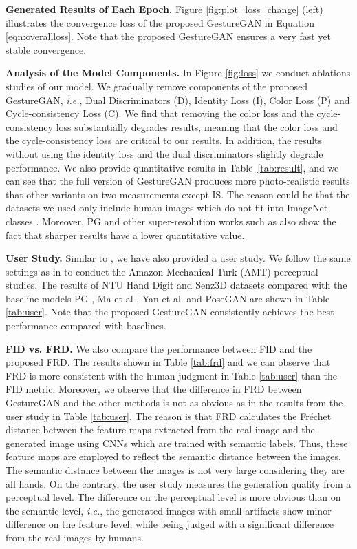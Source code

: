 \documentclass[sigconf]{acmart}
\begin{document}
\noindent \textbf{Generated Results of Each Epoch.}
Figure \ref{fig:plot_loss_change} (left) illustrates the convergence loss  of the proposed GestureGAN in Equation \ref{eqn:overallloss}. 
Note that the proposed GestureGAN ensures a very fast yet stable convergence.

\noindent \textbf{Analysis of the Model Components.}
In Figure \ref{fig:loss} we conduct ablations studies of our model.
We gradually remove components of the proposed GestureGAN, \textit{i.e.}, Dual Discriminators (D), Identity Loss (I), Color Loss (P) and Cycle-consistency Loss (C).
We find that removing the color loss and the cycle-consistency loss substantially degrades results, meaning that the color loss and the cycle-consistency loss are critical to our results.
In addition, the results without using the identity loss and the dual discriminators slightly degrade performance.
We also provide quantitative results in Table~\ref{tab:result}, and we can see that the full version of GestureGAN  produces more photo-realistic results that other variants on two measurements except IS.
The reason could be that the datasets we used only include human images which do not fit into ImageNet classes \cite{deng2009imagenet}. 
Moreover, PG \cite{ma2017pose} and other super-resolution works such as \cite{johnson2016perceptual}  also show the fact that sharper results have a lower quantitative value.

\noindent \textbf{User Study.}
Similar to \cite{ma2017pose,zhu2017unpaired,siarohin2017deformable}, we have also provided a user study. 
We follow the same settings as in \cite{isola2017image} to conduct the Amazon Mechanical Turk (AMT) perceptual studies.
The results of  NTU Hand Digit \cite{liu2016deepfashion} and Senz3D \cite{memo2016head} datasets compared with the baseline models PG \protect\cite{ma2017pose}, Ma et al \cite{ma2017disentangled}, Yan et al. \cite{yan2017skeleton} and PoseGAN \cite{siarohin2017deformable} are shown in Table \ref{tab:user}.
Note that the proposed GestureGAN consistently achieves the best performance compared with baselines.  

\noindent \textbf{FID vs. FRD.}
We also compare the performance between FID and the proposed FRD.
The results shown in Table \ref{tab:frd} and we can observe that FRD is more consistent with the human judgment in Table \ref{tab:user} than the FID metric.
Moreover, we observe that the difference in FRD between GestureGAN and the other methods is not as obvious as in the results from the user study in Table \ref{tab:user}.
The reason is that FRD calculates the Fr\'echet distance between the feature maps extracted from the real image and the generated image using CNNs which are trained with semantic labels. Thus, these feature maps are employed to reflect the semantic distance between the images. The semantic distance between the images is not very large considering they are all hands. On the contrary, the user study measures the generation quality from a perceptual level. The difference on the perceptual level is more obvious than on the semantic level, \emph{i.e.}, the generated images with small artifacts show minor difference on the feature level, while being judged with a significant difference from the real images by humans. 
\end{document}
